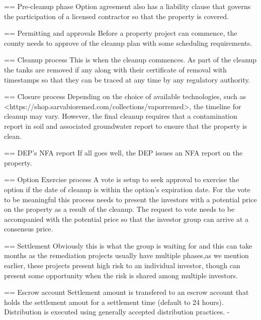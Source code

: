 \documentclass{article}
\begin{document}
{  == Pre-cleanup phase
  Option agreement also has a liability clause that governs the participation of a licensed contractor so that the property is covered. 

  == Permitting and approvals
  Before a property project can commence, the county needs to approve of the cleanup plan with some scheduling requirements. 

  == Cleanup process
  This is when the cleanup commences. As part of the cleanup the tanks are removed if any along with their certificate of removal with timestamps so that they can be traced at any time by any regulatory authority. 

  == Closure process
  Depending on the choice of available technologies, such as <https://shop.sarvabioremed.com/collections/vaporremed>, the timeline for cleanup may vary. However, the final cleanup requires that a contamination report in soil and associated groundwater report to ensure that the property is clean. 

  == DEP's NFA report
  If all goes well, the DEP issues an NFA report on the property. 

  == Option Exercise process
  A vote is setup to seek approval to exercise the option if the date of cleanup is within the option's expiration date. For the vote to be meaningful this process needs to present the investors with a potential price on the property as a result of the cleanup. The request to vote needs to be accompanied with the potential price so that the investor group can arrive at a consensus price. 

  == Settlement 
  Obviously this is what the group is waiting for and this can take months as the remediation projects usually have multiple phases,as we mention earlier, these projects present high risk to an individual investor, though can present some opportunity when the risk is shared among multiple investors.

  == Escrow account
  Settlement amount is transfered to an escrow account that holds the settlement amout for a settlement time (default to 24 hours). Distribution is executed using generally accepted distribution practices.
-}
\end{document}
